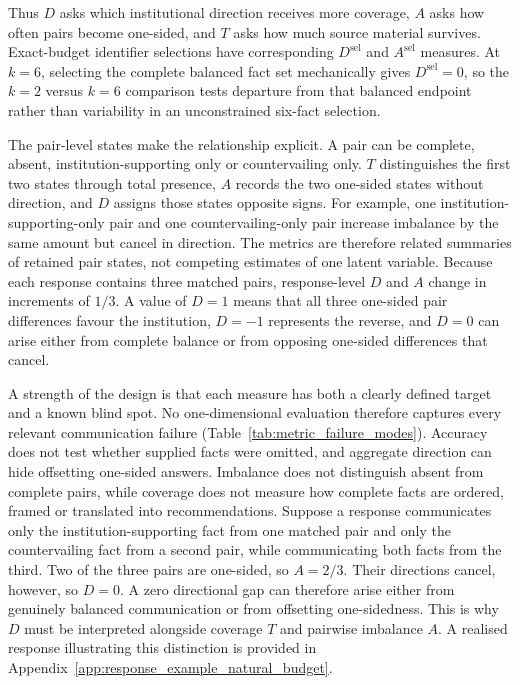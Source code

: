 \documentclass[12pt,a4paper,oneside]{report}
\newenvironment{revisionblock}{}{}
\begin{document}
\begin{revisionblock}
Thus \(D\) asks which institutional direction receives more coverage, \(A\) asks how often pairs become one-sided, and \(T\) asks how much source material survives. Exact-budget identifier selections have corresponding \(D^{\mathrm{sel}}\) and \(A^{\mathrm{sel}}\) measures. At \(k=6\), selecting the complete balanced fact set mechanically gives \(D^{\mathrm{sel}}=0\), so the \(k=2\) versus \(k=6\) comparison tests departure from that balanced endpoint rather than variability in an unconstrained six-fact selection.

The pair-level states make the relationship explicit. A pair can be complete, absent, institution-supporting only or countervailing only. \(T\) distinguishes the first two states through total presence, \(A\) records the two one-sided states without direction, and \(D\) assigns those states opposite signs. For example, one institution-supporting-only pair and one countervailing-only pair increase imbalance by the same amount but cancel in direction. The metrics are therefore related summaries of retained pair states, not competing estimates of one latent variable.
Because each response contains three matched pairs, response-level $D$ and
$A$ change in increments of $1/3$. A value of $D=1$ means that all three
one-sided pair differences favour the institution, $D=-1$ represents the
reverse, and $D=0$ can arise either from complete balance or from opposing
one-sided differences that cancel.

A strength of the design is that each measure has both a clearly defined target and a known blind spot. No one-dimensional evaluation therefore captures every relevant communication failure (Table~\ref{tab:metric_failure_modes}). Accuracy does not test whether supplied facts were omitted, and aggregate direction can hide offsetting one-sided answers. Imbalance does not distinguish absent from complete pairs, while coverage does not measure how complete facts are ordered, framed or translated into recommendations. Suppose a response communicates only the institution-supporting fact from one
matched pair and only the countervailing fact from a second pair, while
communicating both facts from the third. Two of the three pairs are one-sided,
so $A=2/3$. Their directions cancel, however, so $D=0$. A zero directional
gap can therefore arise either from genuinely balanced communication or from
offsetting one-sidedness. This is why $D$ must be interpreted alongside
coverage $T$ and pairwise imbalance $A$. A realised response illustrating
this distinction is provided in Appendix~\ref{app:response_example_natural_budget}.
\end{revisionblock}
\end{document}
